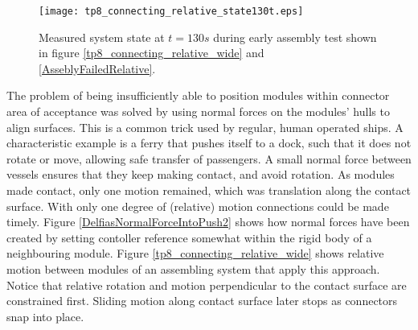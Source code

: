 \begin{figure}[H]
	\centering
	\texttt{[image: tp8\_connecting\_relative\_state130t.eps]}
	\caption{Measured system state at $t=130s$ during early assembly test shown in figure \ref{tp8_connecting_relative_wide} and \ref{AsseblyFailedRelative}.}
	\label{tp8_connecting_relative_state130t}
\end{figure}
The problem of being insufficiently able to position modules within connector area of acceptance was solved by using normal forces on the modules' hulls to align surfaces. This is a common trick used by regular, human operated ships. A characteristic example is a ferry that pushes itself to a dock, such that it does not rotate or move, allowing safe transfer of passengers. A small normal force between vessels ensures that they keep making contact, and avoid rotation. As modules made contact, only one motion remained, which was translation along the contact surface. With only one degree of (relative) motion connections could be made timely. Figure \ref{DelfiasNormalForceIntoPush2} shows how normal forces have been created by setting contoller reference somewhat within the rigid body of a neighbouring module. Figure \ref{tp8_connecting_relative_wide} shows relative motion between modules of an assembling system that apply this approach. Notice that relative rotation and motion perpendicular to the contact surface are constrained first. Sliding motion along contact surface later stops as connectors snap into place. 

